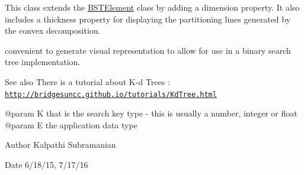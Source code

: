 This class extends the \hyperlink{classbridges_1_1datastructure_1_1_b_s_t_element}{B\+S\+T\+Element} class by adding a dimension property. It also includes a thickness property for displaying the partitioning lines generated by the convex decomposition.

convenient to generate visual representation to allow for use in a binary search tree implementation.

\begin{DoxySeeAlso}{See also}
There is a tutorial about K-\/d Trees \+: \href{http://bridgesuncc.github.io/tutorials/KdTree.html}{\tt http\+://bridgesuncc.\+github.\+io/tutorials/\+Kd\+Tree.\+html} \begin{DoxyVerb} @param K that is the search key type - this is usually a number, integer
    or float
 @param E the application data type
\end{DoxyVerb}

\end{DoxySeeAlso}
\begin{DoxyAuthor}{Author}
Kalpathi Subramanian 
\end{DoxyAuthor}
\begin{DoxyDate}{Date}
6/18/15, 7/17/16 
\end{DoxyDate}
